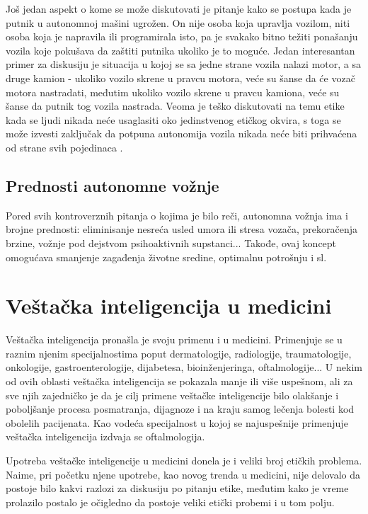 \documentclass[a4paper]{article}
\begin{document}
Još jedan aspekt o kome se može diskutovati je pitanje kako se postupa kada je putnik u autonomnoj mašini ugrožen. On nije osoba koja upravlja vozilom, niti osoba koja je napravila ili programirala isto, pa je svakako bitno težiti ponašanju vozila koje pokušava da zaštiti putnika ukoliko je to moguće. Jedan interesantan primer za diskusiju je situacija u kojoj se sa jedne strane vozila nalazi motor, a sa druge kamion - ukoliko vozilo skrene u pravcu motora, veće su šanse da će vozač motora nastradati, međutim ukoliko vozilo skrene u pravcu kamiona, veće su šanse da putnik tog vozila nastrada. Veoma je teško diskutovati na temu etike kada se ljudi nikada neće usaglasiti oko jedinstvenog etičkog okvira, s toga se može izvesti zaključak da potpuna autonomija vozila nikada neće biti prihvaćena od strane svih pojedinaca \cite{trolley_problem}.\\

\subsection{Prednosti autonomne vožnje}
\label{subsec:Prednosti autonomne vožnje}
Pored svih kontroverznih pitanja o kojima je bilo reči, autonomna vožnja ima i brojne prednosti: eliminisanje nesreća usled umora ili stresa vozača, prekoračenja brzine, vožnje pod dejstvom psihoaktivnih supstanci... Takođe, ovaj koncept omogućava smanjenje zagađenja životne sredine, optimalnu potrošnju i sl.




\section{Veštačka inteligencija u medicini}
\label{sec:upotreba_veštačke_intelijencije_u_medicini}

Veštačka inteligencija pronašla je svoju primenu i u medicini. Primenjuje se u raznim njenim specijalnostima poput dermatologije, radiologije, traumatologije, onkologije, gastroenterologije, dijabetesa, bioinženjeringa, oftalmologije... U nekim od ovih oblasti veštačka inteligencija se pokazala manje ili više uspešnom, ali za sve njih zajedničko je da je cilj primene veštačke inteligencije bilo olakšanje i poboljšanje procesa posmatranja, dijagnoze i na kraju samog lečenja bolesti kod obolelih pacijenata. Kao vodeća specijalnost u kojoj se najuspešnije primenjuje veštačka inteligencija izdvaja se oftalmologija.

Upotreba veštačke inteligencije u medicini donela je i veliki broj etičkih problema. Naime, pri početku njene upotrebe, kao novog trenda u medicini, nije delovalo da postoje bilo kakvi razlozi za diskusiju po pitanju etike, %
međutim kako je vreme prolazilo postalo je očigledno da postoje veliki etički probemi i u tom polju.
\end{document}
